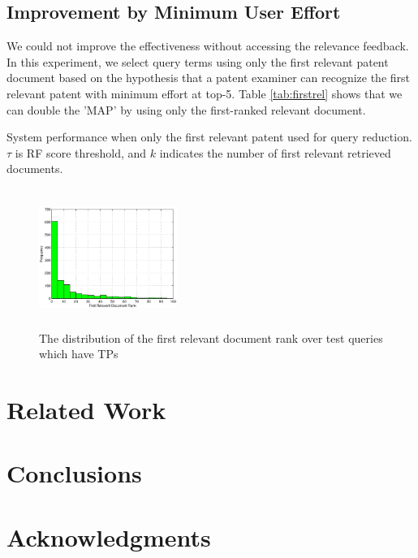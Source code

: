 \documentclass{sig-alternate}
\begin{document}
\subsection{Improvement by Minimum User Effort}
We could not improve the effectiveness without accessing the relevance feedback. In this experiment, we select query terms using only the first relevant patent document based on the hypothesis that a patent examiner can recognize the first relevant patent with minimum effort at top-5.  Table \ref{tab:firstrel} shows that we can double the 'MAP' by using only the first-ranked relevant document.
\begin{table}[htpb]
  \begin{center}
   \caption{System performance when only the first relevant patent used for query reduction. $\tau$ is RF score threshold, and $k$ indicates the number of first relevant retrieved documents.}
     
  \label{tab:firstrel}
  \end{center}  
\end{table}

\begin{figure}[htpb]
   \centering
   \includegraphics[width=0.40\textwidth,height=45mm]{figs/FirstTPRank.eps}
   \caption{The distribution of the first relevant document rank over test queries which have TPs}   
   \label{fig:FirstTPRankHisto} 
\end{figure}

\section{Related Work}

\section{Conclusions}


\section{Acknowledgments}
\end{document}
